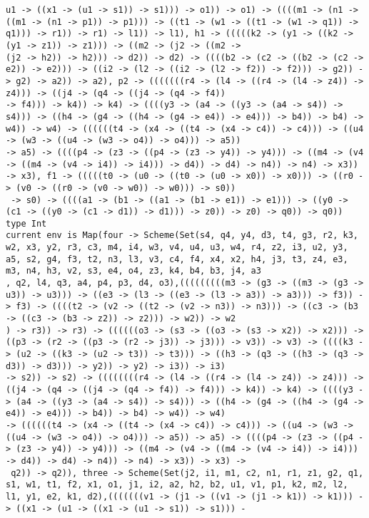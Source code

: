 \documentclass[11pt,oneside,a4paper]{report}
\begin{document}
\begin{lstlisting}[breaklines=true,caption={The output of an exponential type},label=lst:appedix:bigexp]
u1 -> ((x1 -> (u1 -> s1)) -> s1))) -> o1)) -> o1) -> ((((m1 -> (n1 -> ((m1 -> (n1 -> p1)) -> p1))) -> ((t1 -> (w1 -> ((t1 -> (w1 -> q1)) -> q1))) -> r1)) -> r1) -> l1)) -> l1), h1 -> (((((k2 -> (y1 -> ((k2 -> (y1 -> z1)) -> z1))) -> ((m2 -> (j2 -> ((m2 ->
(j2 -> h2)) -> h2))) -> d2)) -> d2) -> ((((b2 -> (c2 -> ((b2 -> (c2 -> e2)) -> e2))) -> ((i2 -> (l2 -> ((i2 -> (l2 -> f2)) -> f2))) -> g2)) -> g2) -> a2)) -> a2), p2 -> (((((((r4 -> (l4 -> ((r4 -> (l4 -> z4)) -> z4))) -> ((j4 -> (q4 -> ((j4 -> (q4 -> f4))
-> f4))) -> k4)) -> k4) -> ((((y3 -> (a4 -> ((y3 -> (a4 -> s4)) -> s4))) -> ((h4 -> (g4 -> ((h4 -> (g4 -> e4)) -> e4))) -> b4)) -> b4) -> w4)) -> w4) -> ((((((t4 -> (x4 -> ((t4 -> (x4 -> c4)) -> c4))) -> ((u4 -> (w3 -> ((u4 -> (w3 -> o4)) -> o4))) -> a5))
-> a5) -> ((((p4 -> (z3 -> ((p4 -> (z3 -> y4)) -> y4))) -> ((m4 -> (v4 -> ((m4 -> (v4 -> i4)) -> i4))) -> d4)) -> d4) -> n4)) -> n4) -> x3)) -> x3), f1 -> (((((t0 -> (u0 -> ((t0 -> (u0 -> x0)) -> x0))) -> ((r0 -> (v0 -> ((r0 -> (v0 -> w0)) -> w0))) -> s0))
 -> s0) -> ((((a1 -> (b1 -> ((a1 -> (b1 -> e1)) -> e1))) -> ((y0 -> (c1 -> ((y0 -> (c1 -> d1)) -> d1))) -> z0)) -> z0) -> q0)) -> q0))
type Int
current env is Map(four -> Scheme(Set(s4, q4, y4, d3, t4, g3, r2, k3, w2, x3, y2, r3, c3, m4, i4, w3, v4, u4, u3, w4, r4, z2, i3, u2, y3, a5, s2, g4, f3, t2, n3, l3, v3, c4, f4, x4, x2, h4, j3, t3, z4, e3, m3, n4, h3, v2, s3, e4, o4, z3, k4, b4, b3, j4, a3
, q2, l4, q3, a4, p4, p3, d4, o3),(((((((((m3 -> (g3 -> ((m3 -> (g3 -> u3)) -> u3))) -> ((e3 -> (l3 -> ((e3 -> (l3 -> a3)) -> a3))) -> f3)) -> f3) -> ((((t2 -> (v2 -> ((t2 -> (v2 -> n3)) -> n3))) -> ((c3 -> (b3 -> ((c3 -> (b3 -> z2)) -> z2))) -> w2)) -> w2
) -> r3)) -> r3) -> ((((((o3 -> (s3 -> ((o3 -> (s3 -> x2)) -> x2))) -> ((p3 -> (r2 -> ((p3 -> (r2 -> j3)) -> j3))) -> v3)) -> v3) -> ((((k3 -> (u2 -> ((k3 -> (u2 -> t3)) -> t3))) -> ((h3 -> (q3 -> ((h3 -> (q3 -> d3)) -> d3))) -> y2)) -> y2) -> i3)) -> i3)
-> s2)) -> s2) -> ((((((((r4 -> (l4 -> ((r4 -> (l4 -> z4)) -> z4))) -> ((j4 -> (q4 -> ((j4 -> (q4 -> f4)) -> f4))) -> k4)) -> k4) -> ((((y3 -> (a4 -> ((y3 -> (a4 -> s4)) -> s4))) -> ((h4 -> (g4 -> ((h4 -> (g4 -> e4)) -> e4))) -> b4)) -> b4) -> w4)) -> w4)
-> ((((((t4 -> (x4 -> ((t4 -> (x4 -> c4)) -> c4))) -> ((u4 -> (w3 -> ((u4 -> (w3 -> o4)) -> o4))) -> a5)) -> a5) -> ((((p4 -> (z3 -> ((p4 -> (z3 -> y4)) -> y4))) -> ((m4 -> (v4 -> ((m4 -> (v4 -> i4)) -> i4))) -> d4)) -> d4) -> n4)) -> n4) -> x3)) -> x3) ->
 q2)) -> q2)), three -> Scheme(Set(j2, i1, m1, c2, n1, r1, z1, g2, q1, s1, w1, t1, f2, x1, o1, j1, i2, a2, h2, b2, u1, v1, p1, k2, m2, l2, l1, y1, e2, k1, d2),(((((((v1 -> (j1 -> ((v1 -> (j1 -> k1)) -> k1))) -> ((x1 -> (u1 -> ((x1 -> (u1 -> s1)) -> s1))) -

\end{lstlisting}
\end{document}

